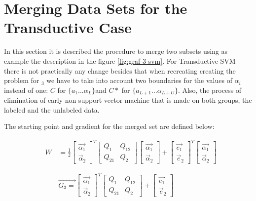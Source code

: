 \section{Merging Data Sets for the Transductive Case}


In this section it is described the procedure to merge two subsets
using as example the description in the figure \ref{fig:graf-3-svm}.
For Transductive SVM there is not practically any change besides that
when recreating creating the problem for $_{3}$ we have
to take into account two boundaries for the values of $\alpha_{i}$
instead of one: $C$ for $\{a_{1}...\alpha_{L}\}$and $C*$ for $\{a_{L+1}...\alpha_{L+U}\}$.
Also, the process of elimination of early non-support vector machine
that is made on both groups, the labeled and the unlabeled data. 

The starting point and gradient for the merged set are defined below:

\begin{eqnarray}
 & W\, & =\frac{1}{2}\left[\begin{array}{c}
\vec{\alpha_{1}}\\
\vec{\alpha}_{2}\end{array}\right]^{T}\left[\begin{array}{cc}
Q_{1} & Q_{12}\\
Q_{21} & Q_{2}\end{array}\right]\left[\begin{array}{c}
\vec{\alpha_{1}}\\
\vec{\alpha}_{2}\end{array}\right]+\left[\begin{array}{c}
\vec{e_{1}}\\
\vec{e}_{2}\end{array}\right]^{T}\left[\begin{array}{c}
\vec{\alpha_{1}}\\
\vec{\alpha}_{2}\end{array}\right]\nonumber \\
\label{eq:mergin-subsets}\\\nonumber \\ &  & \vec{G_{3}=}\left[\begin{array}{c}
\vec{\alpha_{1}}\\
\vec{\alpha}_{2}\end{array}\right]^{T}\left[\begin{array}{cc}
Q_{1} & Q_{12}\\
Q_{21} & Q_{2}\end{array}\right]+\left[\begin{array}{c}
\vec{e_{1}}\\
\vec{e}_{2}\end{array}\right]\nonumber \end{eqnarray}



